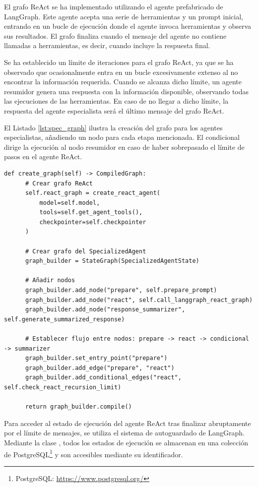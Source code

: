El grafo ReAct se ha implementado utilizando el agente prefabricado  de LangGraph. Este agente acepta una serie de herramientas y un prompt inicial, entrando en un bucle de ejecución donde el agente invoca herramientas y observa sus resultados. El grafo finaliza cuando el mensaje del agente no contiene llamadas a herramientas, es decir, cuando incluye la respuesta final.

Se ha establecido un límite de iteraciones para el grafo ReAct, ya que se ha observado que ocasionalmente entra en un bucle excesivamente extenso al no encontrar la información requerida. Cuando se alcanza dicho límite, un agente resumidor genera una respuesta con la información disponible, observando todas las ejecuciones de las herramientas. En caso de no llegar a dicho límite, la respuesta del agente especialista será el último mensaje del grafo ReAct.

El Listado \ref{lst:spec_graph} ilustra la creación del grafo para los agentes especialistas, añadiendo un nodo para cada etapa mencionada. El condicional  dirige la ejecución al nodo resumidor en caso de haber sobrepasado el límite de pasos en el agente ReAct.

\begin{lstlisting}[caption={\protect\opus{create_graph}: grafo de agentes especializados},label={lst:spec_graph}]
  def create_graph(self) -> CompiledGraph:
      # Crear grafo ReAct
      self.react_graph = create_react_agent(
          model=self.model,
          tools=self.get_agent_tools(),
          checkpointer=self.checkpointer
      )

      # Crear grafo del SpecializedAgent
      graph_builder = StateGraph(SpecializedAgentState)

      # Añadir nodos 
      graph_builder.add_node("prepare", self.prepare_prompt)
      graph_builder.add_node("react", self.call_langgraph_react_graph)
      graph_builder.add_node("response_summarizer", self.generate_summarized_response)

      # Establecer flujo entre nodos: prepare -> react -> condicional -> summarizer 
      graph_builder.set_entry_point("prepare")
      graph_builder.add_edge("prepare", "react")
      graph_builder.add_conditional_edges("react", self.check_react_recursion_limit)

      return graph_builder.compile()
\end{lstlisting}

Para acceder al estado de ejecución del agente ReAct tras finalizar abruptamente por el límite de mensajes, se utiliza el sistema de autoguardado de LangGraph. Mediante la clase , todos los estados de ejecución se almacenan en una colección de PostgreSQL\footnote{PostgreSQL: \url{https://www.postgresql.org/}} y son accesibles mediante su identificador. 

